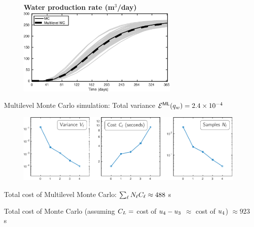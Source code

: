 \begin{frame}{\name{}}
    \begin{figure}
        \centering
        \textbf{Water production rate (m$^3$/day)}
        \includegraphics[width = 0.7\textwidth]{figures/example-1/water-rate-ml.eps}
    \end{figure}
    \begin{squarelist}
        \item Multilevel Monte Carlo simulation: Total variance $\mathcal{E}^{\mathsf{ML}}(q_w) = 2.4\times10^{-4}$
    \end{squarelist}
\end{frame}

\begin{frame}{\name{}}
    \begin{figure}
        \centering
        \includegraphics[width = \textwidth]{figures/example-1/statistics/ex1-statistics.pdf}
    \end{figure}
    \begin{squarelist}
        \item<1-> Total cost of Multilevel Monte Carlo: $\sum_\ell N_\ell C_\ell \approx 488$ s
        \item<2-> Total cost of Monte Carlo (assuming $C_L = $ cost of $u_4 -u_3$ $\approx$ cost of $u_4$) $\approx 923$ s
    \end{squarelist}
\end{frame}











